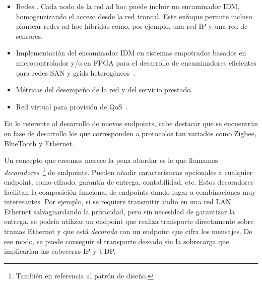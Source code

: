 \documentclass{arco-article}
\begin{document}
\begin{itemize}
\item Redes . Cada nodo de la red ad hoc puede incluir un
  encaminador \ac{IDM}, homogeneizando el acceso desde la red
  troncal. Este enfoque permite incluso plantear redes ad hoc
  híbridas como, por ejemplo, una red \ac{IP} y una red de sensores.

\item Implementación del encaminador \ac{IDM} en sistemas empotrados
  basados en microcontrolador y/o en \ac{FPGA} para el desarrollo de
  encaminadores eficientes para redes \ac{SAN} y grids
  heterogéneos~\cite{Rincon09SupportingOS}.

\item Métricas del desempeño de la red y del servicio prestado.

\item Red virtual para provisión de \ac{QoS}~\cite{Urzaiz09Anovel}.
\end{itemize}

En lo referente al desarrollo de nuevos endpoints, cabe destacar
que se encuentran en fase de desarrollo los que corresponden a
protocolos tan variados como Zigbee, BlueTooth y Ethernet.

Un concepto que creemos merece la pena abordar es lo que llamamos
\emph{decoradores}~\footnote{También en referencia al patrón de
  diseño.} de endpoints.  Pueden añadir características opcionales a
cualquier endpoint, como cifrado, garantía de entrega, contabilidad,
etc.  Estos decoradores facilitan la composición funcional de
endpoints dando lugar a combinaciones muy interesantes.  Por
ejemplo, si se requiere transmitir audio en una red \ac{LAN} Ethernet
salvaguardando la privacidad, pero sin necesidad de garantizar la
entrega, se podría utilizar un endpoint que realiza transporte
directamente sobre tramas Ethernet y que está \emph{decorado} con un
endpoint que cifra los mensajes.  De ese modo, se puede conseguir el
transporte deseado sin la sobrecarga que implicarían las cabeceras
\ac{IP} y \ac{UDP}.
\end{document}
